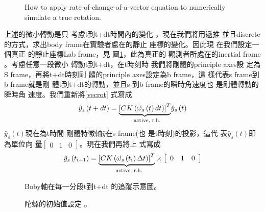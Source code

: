 \documentclass[12pt,twoside]{article}
\begin{document}
\begin{figure}[th]
\caption{How to apply rate-of-change-of-a-vector equation to numerically
simulate a true rotation. }
\label{szsbtdtfig}
\begin{center}
\fbox{}
\end{center}
\end{figure}

上述的微小轉動是只%
考慮t到t+dt時間內的變化%
，現在我們將用遞推%
並且discrete的方式，求出body
frame在實驗者處在的靜止%
座標的變化。因此現%
在我們設定一個真正%
的靜止座標Lab frame\thinspace ，見%
圖\ref{szsbtdtfig}，此為真正的%
觀測者所處在的inertial frame%
。考慮任意一段微小%
轉動t到t+dt，在t時刻時%
我們將剛體的principle axes設%
定為S frame，再將t+dt時刻剛%
體的principle axes設定為b frame，這%
樣代表s frame到b frame就是剛%
體t到t+dt的轉動，並且s%
到b frame的瞬時角速度也%
是剛體轉動的瞬時角%
速度。我們重新將\ref{vecrot}%
式寫成%
\begin{equation}
\hat{y}_{s}\left( t+dt\right) =\underset{\text{active, r.h.}}{\underbrace{%
\left[ CK\left( \vec{\omega}_{s}\left( t\right) dt\right) \right] ^{T}}}\hat{%
y}_{s}\left( t\right)   \label{vecrot05}
\end{equation}%
$\hat{y}_{s}\left( t\right) $現在為t時間%
剛體特徵軸$\hat{y}$在s frame(也%
是t時刻)的投影，這代%
表$\hat{y}_{s}\left( t\right) $即為單位向%
量$\left[ 
\begin{array}{ccc}
0 & 1 & 0%
\end{array}%
\right] $。現在我們再將上%
式寫成%
\begin{equation}
\hat{y}_{s}\left( t_{i+1}\right) =\underset{\text{active, r.h.}}{\underbrace{%
\left[ CK\left( \vec{\omega}_{s}\left( t_{i}\right) \Delta t\right) \right]
^{T}}}\times \left[ 
\begin{array}{ccc}
0 & 1 & 0%
\end{array}%
\right]   \label{vecrot1}
\end{equation}

\begin{figure}[th]
\caption{Boby軸在每一分段t到t+dt%
的追蹤示意圖。}
\begin{center}
\fbox{}
\end{center}
\end{figure}

\begin{figure}[th]
\caption{陀螺的初始值設定%
。}
\begin{center}
\fbox{}
\end{center}
\end{figure}
\end{document}
